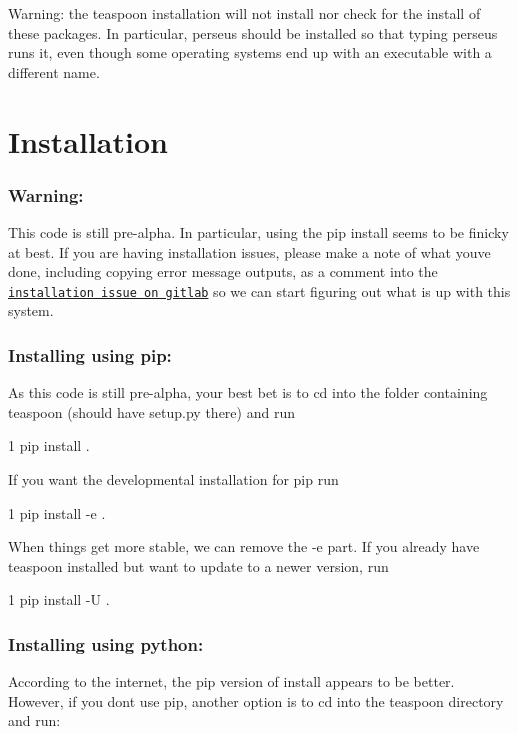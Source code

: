 Warning\+: the teaspoon installation will not install nor check for the install of these packages. In particular, perseus should be installed so that typing {\ttfamily perseus} runs it, even though some operating systems end up with an executable with a different name.

\section*{Installation }

\subsubsection*{Warning\+:}

This code is still pre-\/alpha. In particular, using the pip install seems to be finicky at best. If you are having installation issues, please make a note of what you\textquotesingle{}ve done, including copying error message outputs, as a comment into the \href{https://gitlab.msu.edu/TSAwithTDA/teaspoon/issues/1}{\tt installation issue on gitlab} so we can start figuring out what is up with this system.

\subsubsection*{Installing using pip\+:}

As this code is still pre-\/alpha, your best bet is to cd into the folder containing teaspoon (should have setup.\+py there) and run


\begin{DoxyCode}
1 pip install .
\end{DoxyCode}


If you want the developmental installation for pip run 
\begin{DoxyCode}
1 pip install -e .
\end{DoxyCode}
 When things get more stable, we can remove the -\/e part. If you already have teaspoon installed but want to update to a newer version, run 
\begin{DoxyCode}
1 pip install -U .
\end{DoxyCode}


\subsubsection*{Installing using python\+:}

According to the internet, the pip version of install appears to be better. However, if you don\textquotesingle{}t use pip, another option is to cd into the teaspoon directory and run\+:


